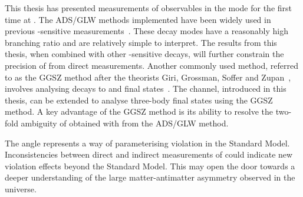 This thesis has presented measurements of \CP observables in the \btodkst mode for the first time at \lhcb. The ADS/GLW methods implemented have been widely used in previous \Pgamma-sensitive measurements~\cite{LHCb-PAPER-2017-021,LHCb-PAPER-2016-006}. These \Dz decay modes have a reasonably high branching ratio and are relatively simple to interpret. The results from this thesis, when combined with other \Pgamma-sensitive decays, will further constrain the precision of \Pgamma from direct measurements. Another commonly used method, referred to as the GGSZ method after the theorists Giri, Grossman, Soffer and Zupan~\cite{GGSZ}, involves analysing \D decays to \KS\pip\pim and \KS\Kp\Km final states~\cite{LHCb-PAPER-2012-027,LHCb-PAPER-2014-041}. The \btodkst channel, introduced in this thesis, can be extended to analyse three-body final states using the GGSZ method. A key advantage of the GGSZ method is its ability to resolve the two-fold ambiguity of \Pgamma obtained with from the ADS/GLW method. 

The angle \Pgamma represents a way of parameterising \CP violation in the Standard Model. Inconsistencies between direct and indirect measurements of \Pgamma could indicate new \CP violation effects beyond the Standard Model. This may open the door towards a deeper understanding of the large matter-antimatter asymmetry observed in the universe.

